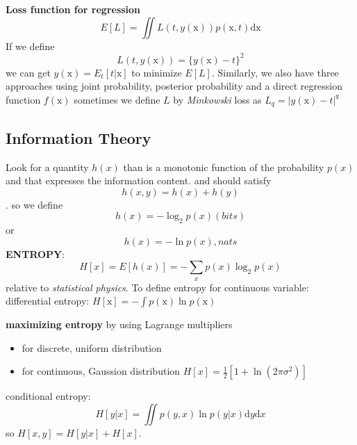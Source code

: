 \documentclass[a4paper]{book}
\begin{document}
\textbf{Loss function for regression}
$$E[L] = \iint L(t,y(\mathrm x))p(\mathrm  x,t)\mathrm {dx}$$
If we define
\begin{equation}\label{eq1.11}
  L(t,y(\mathrm  x)) = \{y(\mathrm  x)-t\}^2
\end{equation}
we can get $y(\mathrm  x) = E_t[t|\mathrm  x]$ to minimize $E[L]$.\newline
Similarly, we also have three approaches using joint probability, posterior probability and a direct regression function $f(\mathrm  x)$\newline
sometimes we define $L$ by \emph{Minkowski} loss as $L_q = |y(\mathrm  x)-t|^q$
\subsection{Information Theory}
Look for a quantity $h(x)$ than is a monotonic function of the probability $p(x)$ and that expresses the information content. and should satisfy
$$h(x,y) = h(x)+h(y)$$.
so we define$$h(x) = -\log_2p(x) (bits)$$  or $$h(x) = -\ln p(x), nats$$
\textbf{ENTROPY}:
\begin{equation}\label{eq1.18}
  H[x] = E[h(x)]= -\sum_xp(x)\log_2p(x)
\end{equation}
relative to \emph{statistical physics}.\newline
To define entropy for continuous variable:\newline
differential entropy: $H[\mathrm x] = -\int p(\mathrm x)\ln p(\mathrm x)$

\textbf{maximizing entropy} by using Lagrange multipliers\newline
\begin{itemize}
  \item for discrete, uniform distribution
  \item  for continuous, Gaussion distribution $H[x] = \frac12[1+\ln (2\pi\sigma^2)]$
\end{itemize}
conditional entropy:
\begin{equation}\label{eq1.12}
H[y|x] = \iint p(y,x)\ln p(y|x) \mathrm dy\mathrm dx
\end{equation}
so  $H[x,y]=H[y|x]+H[x]$.
\end{document}

